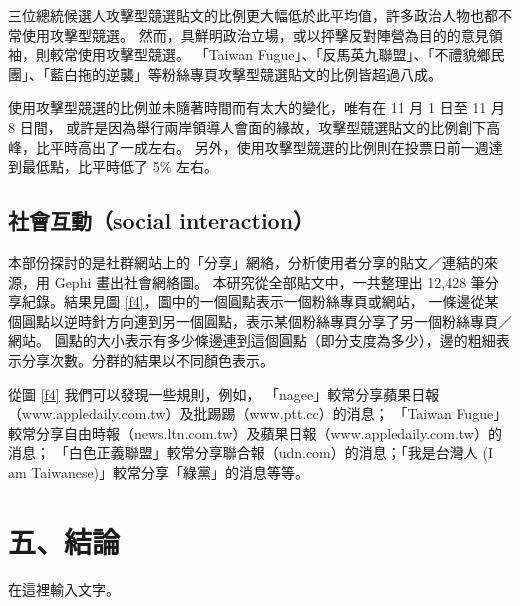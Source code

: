 \documentclass[letterpaper, 10pt, conference]{ieeeconf}   %
\begin{document}
\begin{CJK}{UTF8}{bsmi}
三位總統候選人攻擊型競選貼文的比例更大幅低於此平均值，許多政治人物也都不常使用攻擊型競選。%
然而，具鮮明政治立場，或以抨擊反對陣營為目的的意見領袖，則較常使用攻擊型競選。%
「Taiwan Fugue」、「反馬英九聯盟」、「不禮貌鄉民團」、「藍白拖的逆襲」等粉絲專頁攻擊型競選貼文的比例皆超過八成。%

使用攻擊型競選的比例並未隨著時間而有太大的變化，唯有在 11 月 1 日至 11 月 8 日間，%
或許是因為舉行兩岸領導人會面的緣故，攻擊型競選貼文的比例創下高峰，比平時高出了一成左右。%
另外，使用攻擊型競選的比例則在投票日前一週達到最低點，比平時低了 5\% 左右。%

\subsection*{社會互動（social interaction）}

本部份探討的是社群網站上的「分享」網絡，分析使用者分享的貼文／連結的來源，用 Gephi 畫出社會網絡圖。%
本研究從全部貼文中，一共整理出 12,428 筆分享紀錄。結果見圖 \ref{f4}，圖中的一個圓點表示一個粉絲專頁或網站，%
一條邊從某個圓點以逆時針方向連到另一個圓點，表示某個粉絲專頁分享了另一個粉絲專頁／網站。%
圓點的大小表示有多少條邊連到這個圓點（即分支度為多少），邊的粗細表示分享次數。分群的結果以不同顏色表示。%

從圖 \ref{f4} 我們可以發現一些規則，例如，%
「nagee」較常分享蘋果日報（www.appledaily.com.tw）及批踢踢（www.ptt.cc）的消息；%
「Taiwan Fugue」較常分享自由時報（news.ltn.com.tw）及蘋果日報（www.appledaily.com.tw）的消息；%
「白色正義聯盟」較常分享聯合報（udn.com）的消息；「我是台灣人 (I am Taiwanese)」較常分享「綠黨」的消息等等。%

\section*{五、結論}

在這裡輸入文字。%

\addtolength{\textheight}{-12cm}  %



\end{CJK}
\end{document}
